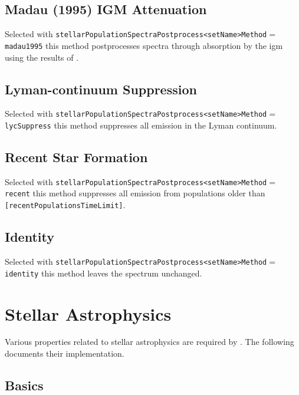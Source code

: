 \subsection{Madau (1995) IGM Attenuation}\label{phys:spectraPostprocessor:spectraPostprocessorMadau1995}

Selected with {\tt stellarPopulationSpectraPostprocess\textless setName\textgreater Method}$=${\tt madau1995} this method postprocesses spectra through absorption by the \gls{igm} using the results of \cite{madau_radiative_1995}.

\subsection{Lyman-continuum Suppression}\label{phys:spectraPostprocessor:spectraPostprocessorLycSuppress}

Selected with {\tt stellarPopulationSpectraPostprocess\textless setName\textgreater Method}$=${\tt lycSuppress} this method suppresses all emission in the Lyman continuum.

\subsection{Recent Star Formation}\label{phys:spectraPostprocessor:spectraPostprocessorRecent}

Selected with {\tt stellarPopulationSpectraPostprocess\textless setName\textgreater Method}$=${\tt recent} this method suppresses all emission from populations older than {\tt [recentPopulationsTimeLimit]}.

\subsection{Identity}\label{phys:spectraPostprocessor:spectraPostprocessorIdentity}

Selected with {\tt stellarPopulationSpectraPostprocess\textless setName\textgreater Method}$=${\tt identity} this method leaves the spectrum unchanged.

\section{Stellar Astrophysics}

Various properties related to stellar astrophysics are required by \glc. The following documents their implementation.

\subsection{Basics}

